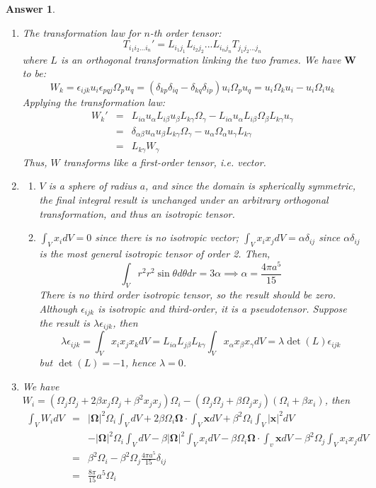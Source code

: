 \documentclass[a4paper]{article}
\newtheorem{ans}{Answer}[section]
\theoremstyle{new}
\begin{document}
\begin{ans}\leavevmode
\begin{enumerate}[label=(\alph*)]
\item The transformation law for $n$-th order tensor:
$$T_{i_1i_2...i_n}'=L_{i_1j_1}L_{i_2j_2}...L_{i_nj_n}T_{j_1j_2...j_n}$$
where $L$ is an orthogonal transformation linking the two frames. We have $\mathbf{W}$ to be:
$$W_k=\epsilon_{ijk}u_i\epsilon_{pqj}\Omega_pu_q=(\delta_{kp}\delta_{iq}-\delta_{kq}\delta_{ip})u_i\Omega_pu_q=u_i\Omega_ku_i-u_i\Omega_iu_k$$
Applying the transformation law:
\begin{eqnarray}
W_k'&=&L_{i\alpha}u_\alpha L_{i\beta}u_\beta L_{k\gamma}\Omega_\gamma-L_{i\alpha}u_\alpha L_{i\beta}\Omega_\beta L_{k\gamma}u_\gamma\nonumber\\&=&\delta_{\alpha\beta}u_\alpha u_\beta L_{k\gamma}\Omega_\gamma-u_\alpha\Omega_\alpha u_\gamma L_{k\gamma}\nonumber\\&=&L_{k\gamma}W_\gamma\nonumber
\end{eqnarray}
Thus, $W$ transforms like a first-order tensor, i.e. vector.
\item 
\begin{enumerate}[label=(\roman*)]
\item $V$ is a sphere of radius $a$, and since the domain is spherically symmetric, the final integral result is unchanged under an arbitrary orthogonal transformation, and thus an isotropic tensor.
\item $\int_Vx_idV=0$ since there is no isotropic vector; $\int_Vx_ix_jdV=\alpha\delta_{ij}$ since $\alpha\delta_{ij}$ is the most general isotropic tensor of order 2. Then,
$$\int_Vr^2r^2\sin\theta d\theta dr=3\alpha\implies\alpha=\frac{4\pi a^5}{15}$$
There is no third order isotropic tensor, so the result should be zero. Although $\epsilon_{ijk}$ is isotropic and third-order, it is a pseudotensor. Suppose the result is $\lambda\epsilon_{ijk}$, then
$$\lambda\epsilon_{ijk}=\int_Vx_ix_jx_kdV=L_{i\alpha}L_{j\beta}L_{k\gamma}\int_Vx_\alpha x_\beta x_\gamma dV=\lambda\det(L)\epsilon_{ijk}$$
but $\det(L)=-1$, hence $\lambda=0$.
\end{enumerate}
\item We have $W_i=(\Omega_j\Omega_j+2\beta x_j\Omega_j+\beta^2x_jx_j)\Omega_i-(\Omega_j\Omega_j+\beta\Omega_jx_j)(\Omega_i+\beta x_i)$, then
\begin{eqnarray}
\int_VW_idV&=&|\boldsymbol{\Omega}|^2\Omega_i\int_VdV+2\beta\Omega_i\boldsymbol{\Omega}\cdot\int_V\mathbf{x}dV+\beta^2\Omega_i\int_V|\mathbf{x}|^2dV\nonumber\\&&-|\boldsymbol{\Omega}|^2\Omega_i\int_VdV-\beta|\boldsymbol{\Omega}|^2\int_Vx_idV-\beta\Omega_i\boldsymbol{\Omega}\cdot\int_v\mathbf{x}dV-\beta^2\Omega_j\int_Vx_ix_jdV\nonumber\\&=&\beta^2\Omega_i-\beta^2\Omega_j\frac{4\pi a^5}{15}\delta_{ij}\nonumber\\&=&\frac{8\pi}{15}a^5\Omega_i\nonumber
\end{eqnarray}
\end{enumerate}
\end{ans}
\end{document}
